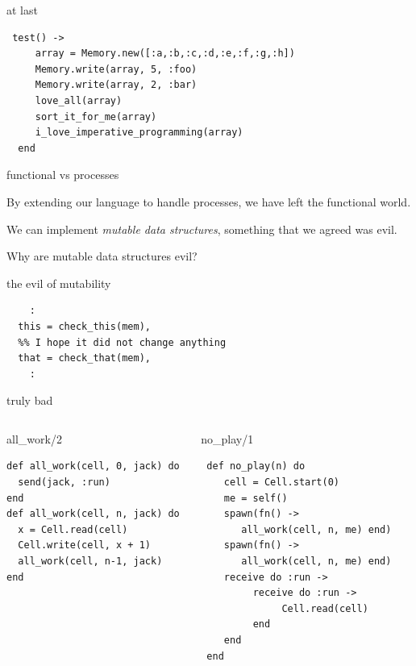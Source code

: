 \begin{frame}[fragile]{at last}

\pause
\begin{verbatim}
 test() -> 
     array = Memory.new([:a,:b,:c,:d,:e,:f,:g,:h])
     Memory.write(array, 5, :foo)
     Memory.write(array, 2, :bar)
     love_all(array)
     sort_it_for_me(array)
     i_love_imperative_programming(array)
  end
\end{verbatim}
\end{frame}

\begin{frame}{functional vs processes}

By extending our language to handle processes, we have left the
functional world. 

\pause\vspace{10pt}
We can implement {\em mutable data structures}, something
that we agreed was evil.

\pause\vspace{20pt}

Why are mutable data structures evil?

\end{frame}

\begin{frame}[fragile]{the evil of mutability}

\pause
\begin{verbatim}
    :
  this = check_this(mem),
  %% I hope it did not change anything
  that = check_that(mem),
    :
\end{verbatim}

\end{frame}

\begin{frame}[fragile]{truly bad}

\begin{columns}
 \begin{column}{0.5\linewidth}
  \begin{block}{all\_work/2}
   \begin{verbatim}
def all_work(cell, 0, jack) do 
  send(jack, :run)
end
def all_work(cell, n, jack) do
  x = Cell.read(cell)
  Cell.write(cell, x + 1)
  all_work(cell, n-1, jack)
end
   \end{verbatim}
  \end{block}
 \end{column}
 \begin{column}{0.5\linewidth}
  \begin{block}{no\_play/1}
\begin{verbatim}
 def no_play(n) do
    cell = Cell.start(0)
    me = self()
    spawn(fn() -> 
       all_work(cell, n, me) end)
    spawn(fn() -> 
       all_work(cell, n, me) end)    
    receive do :run ->
         receive do :run ->
              Cell.read(cell)
         end
    end
 end
\end{verbatim}
  \end{block}
 \end{column}
\end{columns}


\end{frame}

